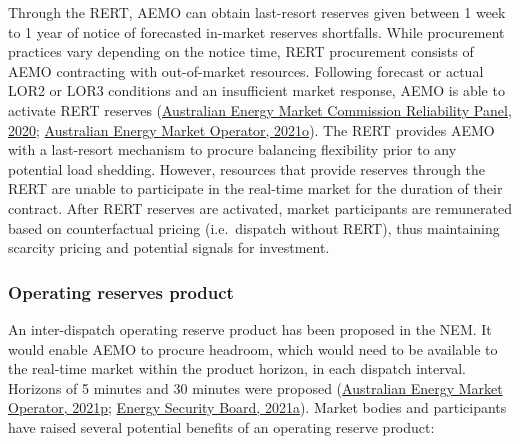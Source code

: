 \documentclass[12pt,a4paper,]{report}
\begin{document}
Through the RERT, AEMO can obtain last-resort reserves given between 1
week to 1 year of notice of forecasted in-market reserves shortfalls.
While procurement practices vary depending on the notice time, RERT
procurement consists of AEMO contracting with out-of-market resources.
Following forecast or actual LOR2 or LOR3 conditions and an insufficient
market response, AEMO is able to activate RERT reserves
(\protect\hyperlink{ref-australianenergymarketcommissionreliabilitypanelReliabilityEmergencyReserve2020}{Australian
Energy Market Commission Reliability Panel, 2020};
\protect\hyperlink{ref-australianenergymarketoperatorProcedureExerciseReliability2021}{Australian
Energy Market Operator, 2021o}). The RERT provides AEMO with a
last-resort mechanism to procure balancing flexibility prior to any
potential load shedding. However, resources that provide reserves
through the RERT are unable to participate in the real-time market for
the duration of their contract. After RERT reserves are activated,
market participants are remunerated based on counterfactual pricing
(i.e.~dispatch without RERT), thus maintaining scarcity pricing and
potential signals for investment.

\hypertarget{sec:reserves-orcontext}{%
\subsubsection{Operating reserves
product}\label{sec:reserves-orcontext}}

An inter-dispatch operating reserve product has been proposed in the
NEM. It would enable AEMO to procure headroom, which would need to be
available to the real-time market within the product horizon, in each
dispatch interval. Horizons of 5 minutes and 30 minutes were proposed
(\protect\hyperlink{ref-australianenergymarketoperatorSubmissionAEMCDirections2021}{Australian
Energy Market Operator, 2021p};
\protect\hyperlink{ref-energysecurityboardPost2025Market2021}{Energy
Security Board, 2021a}). Market bodies and participants have raised
several potential benefits of an operating reserve product:
\end{document}
